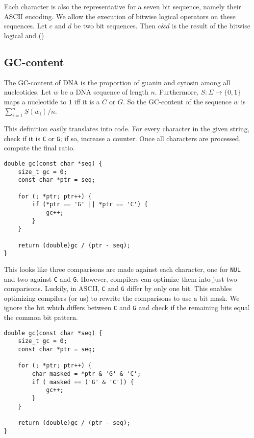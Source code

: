 \documentclass[10pt,letterpaper]{article}
\begin{document}
Each character is also the representative for a seven bit sequence, namely their ASCII encoding. We allow the execution of bitwise logical operators on these sequences. Let $c$ and $d$ be two bit sequences. Then $c {\&} d$ is the result of the bitwise logical and ()


\subsection*{GC-content}

The GC-content of DNA is the proportion of guanin and cytosin among all nucleotides. Let $w$ be a DNA sequence of length $n$. Furthermore, $S\colon \Sigma \to \{0,1\}$ maps a nucleotide to $1$ iff it is a $C$ or $G$. So the GC-content of the sequence $w$ is $\sum_{i=1}^n S(w_i) / n$.

This definition easily translates into code. For every character in the given string, check if it is \lstinline!C! or \lstinline!G!; if so, increase a counter. Once all characters are processed, compute the final ratio.


\lstset{style=algo}

\begin{lstlisting}
double gc(const char *seq) {  
    size_t gc = 0;
    const char *ptr = seq;

    for (; *ptr; ptr++) {
        if (*ptr == 'G' || *ptr == 'C') {
            gc++;
        }
    }

    return (double)gc / (ptr - seq);
}
\end{lstlisting}

This looks like three comparisons are made against each character, one for \lstinline!NUL! and two against \lstinline!C! and \lstinline!G!. However, compilers can optimize them into just two comparisons. Luckily, in ASCII, \lstinline!C! and \lstinline!G! differ by only one bit. This enables optimizing compilers (or us) to rewrite the comparisons to use a bit mask. We ignore the bit which differs between \lstinline!C! and \lstinline!G! and check if the remaining bits equal the common bit pattern.

\begin{lstlisting}
double gc(const char *seq) {  
    size_t gc = 0;
    const char *ptr = seq;

    for (; *ptr; ptr++) {
    	char masked = *ptr & 'G' & 'C';
        if ( masked == ('G' & 'C')) {
            gc++;
        }
    }

    return (double)gc / (ptr - seq);
}
\end{lstlisting}
\end{document}

